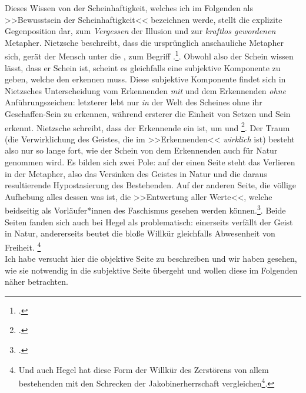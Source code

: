 \documentclass[12pt, a4paper, openany]{report}
\begin{document}
Dieses Wissen von der Scheinhaftigkeit, welches ich im Folgenden als >>Bewusstsein der Scheinhaftigkeit<< bezeichnen werde, stellt die explizite Gegenposition dar, zum \emph{Vergessen} der Illusion und zur \emph{kraftlos gewordenen} Metapher.
Nietzsche beschreibt, dass die ursprünglich anschauliche Metapher sich, gerät der Mensch unter die , zum Begriff .\footcite[][881]{nietzsche_geburt_1999}.
Obwohl also der Schein wissen lässt, dass er Schein ist, scheint es gleichfalls eine subjektive Komponente zu geben, welche den  erkennen muss.
Diese subjektive Komponente findet sich in Nietzsches Unterscheidung vom Erkennenden \emph{mit} und dem Erkennenden \emph{ohne} Anführungszeichen:
letzterer lebt nur \emph{in} der Welt des Scheines ohne ihr Geschaffen-Sein zu erkennen, während ersterer die Einheit von Setzen und Sein erkennt. 
Nietzsche schreibt, dass der Erkennende ein  ist, um  und \footcite[][417]{nietzsche_morgenrote_1999}.
Der Traum (die Verwirklichung des Geistes, die im >>Erkennenden<< \emph{wirklich} ist) besteht also nur so lange fort, wie der Schein von dem Erkennenden auch für Natur genommen wird. 
Es bilden sich zwei Pole:
auf der einen Seite steht das Verlieren in der Metapher, also das Versinken des Geistes in Natur und die daraus resultierende Hypostasierung des Bestehenden.
Auf der anderen Seite, die völlige Aufhebung alles dessen was ist, die >>Entwertung aller Werte<<, welche beidseitig als Vorläufer*innen des Faschismus gesehen werden können.\footcite[Vergleiche dazu beispielsweise:][S. 61, S. 69]{stephan_nietzscheanismus_2019}.
Beide Seiten fanden sich auch bei Hegel als problematisch:
einerseits verfällt der Geist in Natur, andererseits beutet die bloße Willkür gleichfalls Abwesenheit von Freiheit.%
\footnote{
    Und auch Hegel hat diese Form der Willkür des Zerstörens von allem bestehenden mit den Schrecken der Jakobinerherrschaft vergleichen\footcite[Vgl.][39]{hegel_grundlinien_2017}.
}\\

Ich habe versucht hier die objektive Seite zu beschreiben und wir haben gesehen, wie sie notwendig in die subjektive Seite übergeht und wollen diese im Folgenden näher betrachten.
\end{document}

